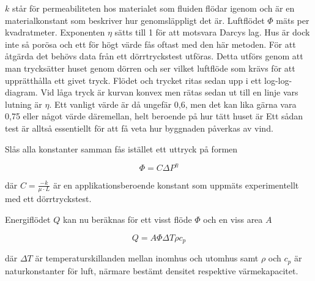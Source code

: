 $k$ står för permeabiliteten hos materialet som fluiden flödar igenom och är en 
material\-konstant som beskriver hur genomsläppligt det är. Luftflödet $\Phi$ mäts per 
kvadratmeter. Exponenten $\eta$ sätts till 1 för att motsvara Darcys lag. Hus är dock inte så
 porösa och ett för högt värde fås oftast med den här metoden. För att åtgärda det behövs 
 data från ett dörrtryckstest utföras. Detta utförs genom att man trycksätter huset genom 
 dörren och ser vilket luftflöde som krävs för att upprätthålla ett givet tryck. Flödet och trycket 
 ritas sedan upp i ett log-log-diagram. Vid låga tryck är kurvan konvex men rätas sedan ut till 
 en linje vars lutning är $\eta$. Ett vanligt värde är då ungefär 0,6, men det kan lika gärna vara 0,75 eller något värde däremellan, helt beroende på hur tätt huset är\cite{sasic} Ett sådan test är alltså essentiellt för att få veta hur byggnaden 
 påverkas av vind.
 
Slås alla konstanter samman fås istället ett uttryck på formen

\begin{equation}
\Phi = C\Delta P^\eta
\end{equation}

där $C=\frac{-k}{\mu \cdot L}$ är en applikationsberoende konstant som uppmäts experimentellt med ett dörrtryckstest. 

Energiflödet $Q$ kan nu beräknas för ett visst flöde $\Phi$ och en viss area $A$

\begin{equation}
Q = A \Phi \Delta T \rho c_p
\end{equation}

där $\Delta T$ är temperaturskillanden mellan inomhus och utomhus samt $\rho$ och $c_p$ är naturkonstanter för luft, närmare bestämt densitet respektive värmekapacitet.


